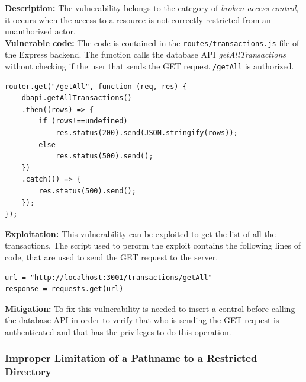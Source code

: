 \documentclass[]{article}
\begin{document}
\textbf{Description:} The vulnerability belongs to the category of {\it broken access control}, it occurs when the access to a resource is not correctly restricted from an unauthorized actor. 
\\ 
\textbf{Vulnerable code:} The code is contained in the \texttt{routes/transactions.js} file of the Express backend. The function calls the database
API {\it getAllTransactions} without checking if the user that sends the GET request \texttt{/getAll} is authorized.

\begin{lstlisting}
router.get("/getAll", function (req, res) { 
    dbapi.getAllTransactions()
    .then((rows) => {
        if (rows!==undefined)
            res.status(200).send(JSON.stringify(rows));
        else
            res.status(500).send();
    })
    .catch(() => {
        res.status(500).send();
    }); 
});
\end{lstlisting}
\textbf{Exploitation:} This vulnerability can be exploited to get the list of all the transactions. The script used to perorm the exploit contains the
following lines of code, that are used to send the GET request to the server.

\begin{lstlisting}
url = "http://localhost:3001/transactions/getAll"
response = requests.get(url)
\end{lstlisting}
\textbf{Mitigation:} To fix this vulnerability is needed to insert a control before calling the database API in order to verify that who is sending the 
GET request is authenticated and that has the privileges to do this operation.

\subsubsection{Improper Limitation of a Pathname to a Restricted Directory}
\label{subsubsec:improper_limitation_of_a_pathname_to_a_restricted_directory}
\end{document}
